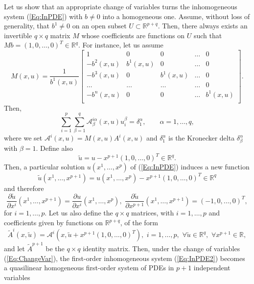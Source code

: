 \documentclass{birkjour}
\theoremstyle{definition}
\theoremstyle{remark}
\numberwithin{equation}{section}
\numberwithin{equation}{section}
\numberwithin{thm}{section}
\numberwithin{equation}{section}
\numberwithin{thm}{section}
\begin{document}
Let us show that an appropriate change of variables turns the inhomogeneous system (\ref{Eq:InPDE}) with $b\neq 0$ into a homogeneous one. Assume, without loss of generality, that $b^1\neq 0$ on an open subset $U\subset \mathbb{R}^{p+q}$. Then, there always exists an invertible $q\times q$ matrix $M$ whose coefficients are functions on $U$ such that $Mb=(1,0,\ldots,0)^T\in \mathbb{R}^q$. For instance, let us assume
\begin{equation}\label{Eq:M}
	M(x,u)=\frac{1}{b^1(x,u)}\left[\begin{array}{ccccc}
		1&0&0&\ldots&0\\
		-b^2(x,u)&b^1(x,u)&0&\ldots&0\\
		-b^3(x,u)&0&b^1(x,u)&\ldots&0\\
		\ldots&\ldots&\ldots&\ldots&0\\
		-b^n(x,u)&0&0&\ldots&b^1(x,u)\\
	\end{array}\right].
\end{equation}
Then,
\begin{equation}\label{Eq:InPDE2}
	\sum_{i=1}^p\sum_{\beta=1}^q\mathcal{A}^{i\alpha}_\beta(x,u)u^\beta_i=\delta_1^\alpha,\qquad \alpha=1,\ldots,q,
\end{equation}
where we set $\mathcal{A}^i(x,u)=M(x,u)A^i(x,u)$ and $\delta_1^\alpha$ is the Kronecker delta $\delta^\alpha_\beta$ with $\beta=1$. Define also
\begin{equation}\label{Eq:ChangeVar}
	\tilde{u}=u-x^{p+1}(1,0,\ldots,0)^T\in \mathbb{R}^q.
\end{equation}
Then, a particular solution $u(x^1,\ldots,x^p)$ of (\ref{Eq:InPDE}) induces a new function 
$$
\tilde{u}(x^1,\ldots,x^{p+1})=u(x^1,\ldots,x^p)-x^{p+1}(1,0,\ldots,0)^T\in \mathbb{R}^q
$$
and therefore
$$
\frac{\partial\tilde  u}{\partial x^i}(x^1,\ldots,x^{p+1})\!=\!\frac{\partial u}{\partial x^i}(x^1,\ldots,x^p),\,\, \frac{\partial \tilde u}{\partial x^{p+1}}(x^1,\ldots,x^{p+1})\!=\!(-1,0,\ldots,0)^T,
$$
for $i=1,\ldots,p$. Let us also define the $q\times q$ matrices, with $i=1,\ldots,p$ and coefficients given by functions on $\mathbb{R}^{p+q}$, of the form
$$
\tilde{A}^i(x,\tilde{u})=\mathcal{A}^i(x,\tilde{u}+x^{p+1}(1,0,\ldots,0) ^T),\,\, i=1,\ldots,p,\,\, \forall \tilde{u}\in \mathbb{R}^q, \,\, \forall x^{p+1}\in \mathbb{R},
$$
and let $\tilde{A}^{p+1}$ be the $q\times q$ identity matrix. Then, under the change of variables (\ref{Eq:ChangeVar}), the first-order inhomogeneous system (\ref{Eq:InPDE2}) becomes a quasilinear homogeneous first-order system of PDEs in $p+1$ independent variables
\end{document}
